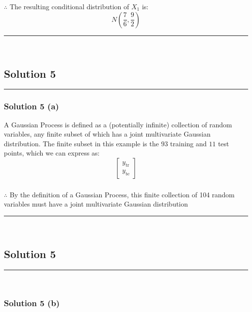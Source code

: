 \documentclass{article}
\begin{document}
\subsubsection*{\normalfont}{$\therefore$ The resulting conditional distribution of $X_1$ is:}
$$N\left(\frac{7}{6}, \frac{9}{2}\right)$$

\noindent\rule{\textwidth}{0.4pt}\\

\newpage

\subsection*{Solution 5}
\noindent\rule{\textwidth}{0.4pt}
\subsubsection*{Solution 5 (a)}
A Gaussian Process is defined as a (potentially infinite) collection of random variables, any finite subset of which has a joint multivariate Gaussian distribution.
The finite subset in this example is the $93$ training and $11$ test points, which we can express as:
$$\begin{bmatrix} y_{\text{tr}} \\ y_{\text{te}} \end{bmatrix}$$
\subsubsection*{\normalfont}{$\therefore$ By the definition of a Gaussian Process, this finite collection of 104 random variables must have a joint multivariate Gaussian distribution}

\noindent\rule{\textwidth}{0.4pt}\\

\newpage

\subsection*{Solution 5}
\noindent\rule{\textwidth}{0.4pt}\\
\subsubsection*{Solution 5 (b)}
\end{document}
